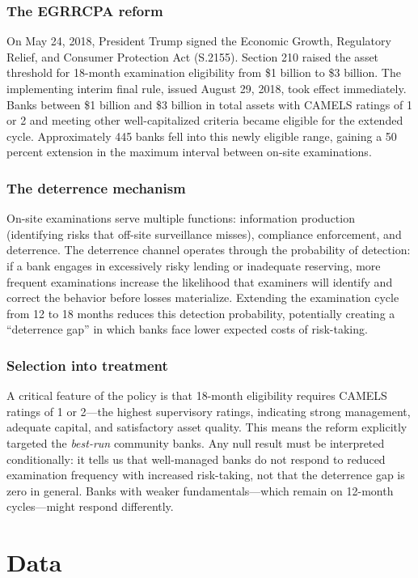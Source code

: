 \documentclass[12pt]{article}
\begin{document}
\subsubsection*{The EGRRCPA reform} On May 24, 2018, President Trump signed the Economic Growth, Regulatory Relief, and Consumer Protection Act (S.2155). Section 210 raised the asset threshold for 18-month examination eligibility from \$1 billion to \$3 billion. The implementing interim final rule, issued August 29, 2018, took effect immediately. Banks between \$1 billion and \$3 billion in total assets with CAMELS ratings of 1 or 2 and meeting other well-capitalized criteria became eligible for the extended cycle. Approximately 445 banks fell into this newly eligible range, gaining a 50 percent extension in the maximum interval between on-site examinations.

\subsubsection*{The deterrence mechanism} On-site examinations serve multiple functions: information production (identifying risks that off-site surveillance misses), compliance enforcement, and deterrence. The deterrence channel operates through the probability of detection: if a bank engages in excessively risky lending or inadequate reserving, more frequent examinations increase the likelihood that examiners will identify and correct the behavior before losses materialize. Extending the examination cycle from 12 to 18 months reduces this detection probability, potentially creating a ``deterrence gap'' in which banks face lower expected costs of risk-taking.

\subsubsection*{Selection into treatment} A critical feature of the policy is that 18-month eligibility requires CAMELS ratings of 1 or 2---the highest supervisory ratings, indicating strong management, adequate capital, and satisfactory asset quality. This means the reform explicitly targeted the \textit{best-run} community banks. Any null result must be interpreted conditionally: it tells us that well-managed banks do not respond to reduced examination frequency with increased risk-taking, not that the deterrence gap is zero in general. Banks with weaker fundamentals---which remain on 12-month cycles---might respond differently.


\section{Data}
\end{document}
